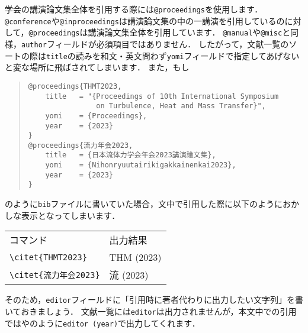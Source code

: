 \documentclass[a4paper,fleqn,uplatex,dvipdfmx]{jsarticle}
\makeatletter
\newcommand{\ttconference}{\texttt{@conference}}
\newcommand{\ttinproceedings}{\texttt{@inproceedings}}
\newcommand{\ttmanual}{\texttt{@manual}}
\newcommand{\ttmisc}{\texttt{@misc}}
\newcommand{\ttproceedings}{\texttt{@proceedings}}
\makeatother
\begin{document}
学会の講演論文集全体を引用する際には\ttproceedings を使用します．
\ttconference や\ttinproceedings は講演論文集の中の一講演を引用しているのに対して，\ttproceedings は講演論文集全体を引用しています．
\ttmanual や\ttmisc と同様，\verb|author|フィールドが必須項目ではありません．
したがって，文献一覧のソートの際は\verb|title|の読みを和文・英文問わず\verb|yomi|フィールドで指定してあげないと変な場所に飛ばされてしまいます．
また，もし
\begin{quote}
\begin{verbatim}
@proceedings{THMT2023,
    title   = "{Proceedings of 10th International Symposium 
                on Turbulence, Heat and Mass Transfer}",
    yomi    = {Proceedings},
    year    = {2023}
}
@proceedings{流力年会2023,
    title   = {日本流体力学会年会2023講演論文集},
    yomi    = {Nihonryuutairikigakkainenkai2023},
    year    = {2023}
}
\end{verbatim}
\end{quote}
のように\verb|bib|ファイルに書いていた場合，文中で引用した際に以下のようにおかしな表示となってしまいます．
\begin{table}[h]
    \centering
    \begin{tabular}{ll}
        コマンド    &出力結果 \\
        \verb|\citet{THMT2023}| &THM (2023) \\
        \verb|\citet{流力年会2023}| &流 (2023) \\
    \end{tabular}
\end{table}
そのため，\verb|editor|フィールドに「引用時に著者代わりに出力したい文字列」を書いておきましょう．
文献一覧には\verb|editor|は出力されませんが，本文中での引用では\citet{THMT2023}や\citet{流力年会2023}のように\verb|editor (year)|で出力してくれます．
\end{document}
